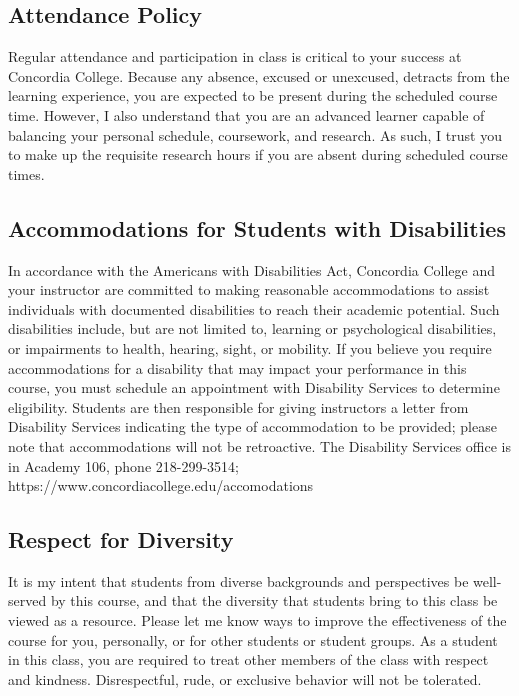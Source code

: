 \documentclass{tufte-handout}
\begin{document}
\begin{fullwidth}

\subsection{Attendance Policy}

Regular attendance and participation in class is critical to your success at Concordia College. Because any absence, excused or unexcused, detracts from the learning experience, you are expected to be present during the scheduled course time. However, I also understand that you are an advanced learner capable of balancing your personal schedule, coursework, and research. As such, I trust you to make up the requisite research hours if you are absent during scheduled course times. 


\subsection{Accommodations for Students with Disabilities}

In accordance with the Americans with Disabilities Act, Concordia College and your instructor are committed to making reasonable accommodations to assist individuals with documented disabilities to reach their academic potential. Such disabilities include, but are not limited to, learning or psychological disabilities, or impairments to health, hearing, sight, or mobility. If you believe you require accommodations for a disability that may impact your performance in this course, you must schedule an appointment with Disability Services to determine eligibility. Students are then responsible for giving instructors a letter from Disability Services indicating the type of accommodation to be provided; please note that accommodations will not be retroactive. The Disability Services office is in Academy 106, phone 218-299-3514; https://www.concordiacollege.edu/accomodations


\subsection{Respect for Diversity}

It is my intent that students from diverse backgrounds and perspectives be well-served by this course, and that the diversity that students bring to this class be viewed as a resource. Please let me know ways to improve the effectiveness of the course for you, personally, or for other students or student groups. As a student in this class, you are required to treat other members of the class with respect and kindness. Disrespectful, rude, or exclusive behavior will not be tolerated.


\end{fullwidth}
\end{document}
